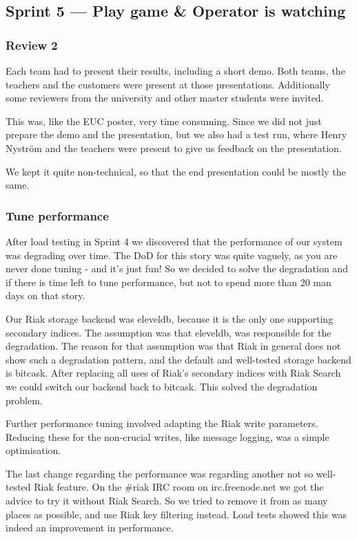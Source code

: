 \documentclass[11pt,a4paper]{report}
\begin{document}
\subsection*{Sprint 5 --- Play game \& Operator is watching}
\subsubsection{Review 2}
Each team had to present their results, including a short demo. Both teams, the
teachers and the customers were present at those presentations. Additionally
some reviewers from the university and other master students were invited.

This was, like the EUC poster, very time consuming. Since we did not just
prepare the demo and the presentation, but we also had a test run, where Henry
Nyström and the teachers were present to give us feedback on the presentation.

We kept it quite non-technical, so that the end presentation could be mostly the
same.

\subsubsection{Tune performance}
After load testing in Sprint 4 we discovered that the performance of our system
was degrading over time. The DoD for this story was quite vaguely, as you are
never done tuning - and it's just fun! So we decided to solve the degradation
and if there is time left to tune performance, but not to spend more than 20 man
days on that story.

Our Riak storage backend was eleveldb, because it is the only one supporting
secondary indices. The assumption was that eleveldb, was responsible for the
degradation. The reason for that assumption was that Riak in general does not
show such a degradation pattern, and the default and well-tested storage backend
is bitcask. After replacing all uses of Riak's secondary indices with Riak
Search we could switch our backend back to bitcask.  This solved the degradation
problem.

Further performance tuning involved adapting the Riak write parameters.
Reducing these for the non-crucial writes, like message logging, was a simple
optimisation.

The last change regarding the performance was regarding another not so
well-tested Riak feature. On the \#riak IRC room on irc.freenode.net we got
the advice to try it without Riak Search. So we tried to remove it from as
many places as possible, and use Riak key filtering instead.  Load tests showed
this was indeed an improvement in performance.
\end{document}

